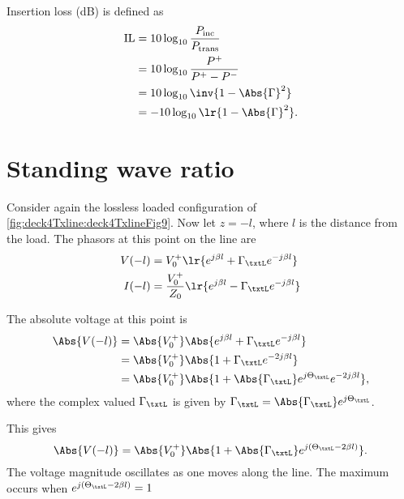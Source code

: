 Insertion loss (dB) is defined as
\begin{equation}\label{eqn:uwaves4TransmissionLines:1080}
\begin{aligned}
\textrm{IL}
&= 10 \log_{10} \frac{P_{\textrm{inc}}}{P_{\textrm{trans}}}
\\ &= 10 \log_{10} \frac{P^{+}}{P^{+} - P^{-}}
\\ &= 10 \log_{10} \inv{1 - \Abs{\Gamma}^2}
\\ &= -10 \log_{10} \lr{ 1 - \Abs{\Gamma}^2 }.
\end{aligned}
\end{equation}
\section{Standing wave ratio}
Consider again the lossless loaded configuration of \cref{fig:deck4Txline:deck4TxlineFig9}.  Now let \( z = - l \), where \( l \) is the distance from the load.  The phasors at this point on the line are
\begin{equation}\label{eqn:uwaves4TransmissionLines:1100}
\begin{aligned}
V(-l) &= V_0^{+} \lr{ e^{j \beta l} + \Gamma_\txtL e^{-j \beta l} } \\
I(-l) &= \frac{V_0^{+}}{Z_0} \lr{ e^{j \beta l} - \Gamma_\txtL  e^{-j \beta l} } \\
\end{aligned}
\end{equation}

The absolute voltage at this point is
\begin{equation}\label{eqn:uwaves4TransmissionLines:1120}
\begin{aligned}
\Abs{V(-l)}
&= \Abs{V_0^{+}} \Abs{ e^{j \beta l} + \Gamma_\txtL e^{-j \beta l} }
\\ &= \Abs{V_0^{+}} \Abs{ 1 + \Gamma_\txtL e^{-2 j \beta l} }
\\ &= \Abs{V_0^{+}} \Abs{ 1 + \Abs{\Gamma_\txtL} e^{j \Theta_\txtL} e^{-2 j \beta l} },
\end{aligned}
\end{equation}
where the complex valued \( \Gamma_\txtL \) is given by \( \Gamma_\txtL = \Abs{\Gamma_\txtL} e^{j \Theta_\txtL} \).

This gives
\begin{equation}\label{eqn:uwaves4TransmissionLines:1140}
\Abs{V(-l)}
= \Abs{V_0^{+}} \Abs{ 1 + \Abs{\Gamma_\txtL} e^{j(\Theta_\txtL -2 \beta l)} }.
\end{equation}
The voltage magnitude oscillates as one moves along the line.  The maximum occurs when \( e^{j (\Theta_\txtL -2 \beta l)}  = 1 \)

